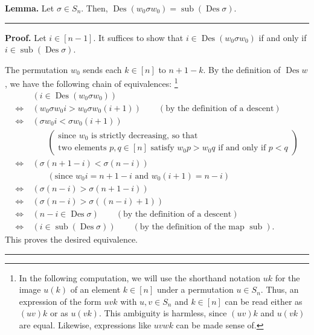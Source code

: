\documentclass[12pt]{article}
\theoremstyle{definition}%
\newtheorem{lem}[thm]{Lemma}
\theoremstyle{definition}%
\theoremstyle{remark}%
\newcommand{\tup}[1]{\left( #1 \right)}
\newcommand{\interval}[1]{\left[ #1 \right]} %
\newcommand{\wo}{w_0} %
\newcommand{\Des}{\operatorname{Des}}
\newcommand{\sub}{\operatorname{sub}}
\newenvironment{lem}[1][Lemma]{\noindent\textbf{#1.} }{\ \rule{0.5em}{0.5em}}
\newenvironment{proof}[1][Proof]{\noindent\textbf{#1.} }{\ \rule{0.5em}{0.5em}}
\begin{document}
\begin{lem}
    \label{w0conj_lem}
   Let $\sigma \in S_n$. Then, $\Des \tup{\wo \sigma \wo} = \sub \tup{\Des \sigma}$. 
\end{lem}

\begin{proof}
    Let $i \in \interval{n-1}$. It suffices to show that $ i \in \Des \tup{\wo \sigma \wo} $ if and only if $ i \in \sub \tup{\Des \sigma}$.
    
    The permutation $\wo$ sends each $k \in \interval{n}$ to $n+1-k$. By the definition of $\Des w$, we have the following chain of equivalences:%
	\footnote{In the following computation, we will use the shorthand notation $uk$ for the image $u\tup{k}$ of an element $k \in \interval{n}$ under a permutation $u \in S_n$.
	Thus, an expression of the form $uvk$ with $u,v \in S_n$ and $k \in \interval{n}$ can be read either as $\tup{uv}k$ or as $u\tup{vk}$.
	This ambiguity is harmless, since $\tup{uv}k$ and $u\tup{vk}$ are equal.
	Likewise, expressions like $uvwk$ can be made sense of.}
    \begin{align*}
             & \ \tup{i \in \Des \tup{\wo \sigma \wo}} \\
        \iff & \ \tup{\wo \sigma \wo i > \wo \sigma \wo \tup{i+1}}
		            \qquad \tup{\text{by the definition of a descent}} \\
        \iff & \ \tup{\sigma \wo i < \sigma \wo \tup{i+1}} \\
        & \qquad \tup{\begin{array}{c}\text{since $\wo$ is strictly decreasing, so that} \\ \text{two elements $p,q \in \interval{n}$ satisfy $\wo p > \wo q$ if and only if $p<q$} \end{array}} \\
        \iff & \ \tup{\sigma\tup{n+1-i} < \sigma\tup{n-i}} \\
        & \qquad \tup{\text{since $\wo i = n+1-i$ and $\wo\tup{i+1} = n-i$}} \\
        \iff & \ \tup{\sigma\tup{n-i} > \sigma\tup{n+1-i}} \\ 
        \iff & \ \tup{\sigma\tup{n-i} > \sigma\tup{(n-i)+1}} \\
        \iff & \ \tup{n-i \in \Des \sigma}
		            \qquad \tup{\text{by the definition of a descent}} \\
        \iff & \ \tup{i \in \sub \tup{\Des \sigma}}
			        \qquad \tup{\text{by the definition of the map $\sub$}}.
    \end{align*}
    This proves the desired equivalence.
\end{proof}
\end{document}
